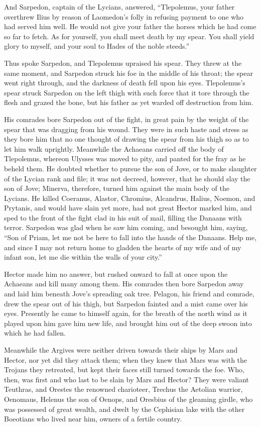 And Sarpedon, captain of the Lycians, answered, “Tlepolemus, your father
overthrew Ilius by reason of Laomedon’s folly in refusing payment to one
who had served him well. He would not give your father the horses which he
had come so far to fetch. As for yourself, you shall meet death by my
spear. You shall yield glory to myself, and your soul to Hades of the
noble steeds.”

Thus spoke Sarpedon, and Tlepolemus upraised his spear. They threw at the
same moment, and Sarpedon struck his foe in the middle of his throat; the
spear went right through, and the darkness of death fell upon his eyes.
Tlepolemus’s spear struck Sarpedon on the left thigh with such force that
it tore through the flesh and grazed the bone, but his father as yet
warded off destruction from him.

His comrades bore Sarpedon out of the fight, in great pain by the weight
of the spear that was dragging from his wound. They were in such haste and
stress as they bore him that no one thought of drawing the spear from his
thigh so as to let him walk uprightly. Meanwhile the Achaeans carried off
the body of Tlepolemus, whereon Ulysses was moved to pity, and panted for
the fray as he beheld them. He doubted whether to pursue the son of Jove,
or to make slaughter of the Lycian rank and file; it was not decreed,
however, that he should slay the son of Jove; Minerva, therefore, turned
him against the main body of the Lycians. He killed Coeranus, Alastor,
Chromius, Alcandrus, Halius, Noemon, and Prytanis, and would have slain
yet more, had not great Hector marked him, and sped to the front of the
fight clad in his suit of mail, filling the Danaans with terror. Sarpedon
was glad when he saw him coming, and besought him, saying, “Son of Priam,
let me not be here to fall into the hands of the Danaans. Help me, and
since I may not return home to gladden the hearts of my wife and of my
infant son, let me die within the walls of your city.”

Hector made him no answer, but rushed onward to fall at once upon the
Achaeans and kill many among them. His comrades then bore Sarpedon away
and laid him beneath Jove’s spreading oak tree. Pelagon, his friend and
comrade, drew the spear out of his thigh, but Sarpedon fainted and a mist
came over his eyes. Presently he came to himself again, for the breath of
the north wind as it played upon him gave him new life, and brought him
out of the deep swoon into which he had fallen.

Meanwhile the Argives were neither driven towards their ships by Mars and
Hector, nor yet did they attack them; when they knew that Mars was with
the Trojans they retreated, but kept their faces still turned towards the
foe. Who, then, was first and who last to be slain by Mars and Hector?
They were valiant Teuthras, and Orestes the renowned charioteer, Trechus
the Aetolian warrior, Oenomaus, Helenus the son of Oenops, and Oresbius of
the gleaming girdle, who was possessed of great wealth, and dwelt by the
Cephisian lake with the other Boeotians who lived near him, owners of a
fertile country.


